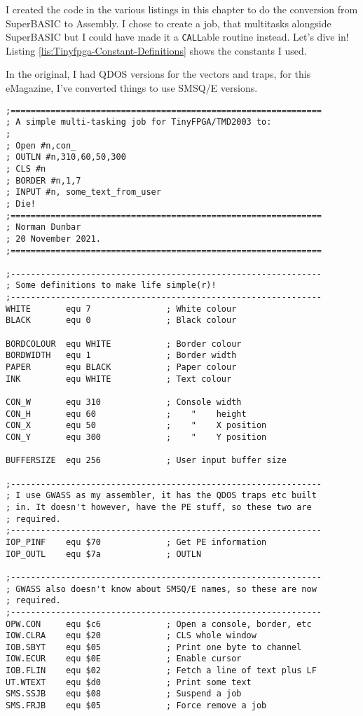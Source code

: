 I created the code in the various listings in this chapter to do the
conversion from SuperBASIC to Assembly. I chose to create a job, that
multitasks alongside SuperBASIC but I could have made it a \texttt{CALL}able
routine instead. Let's dive in! Listing \ref{lis:Tinyfpga-Constant-Definitions}
shows the constants I used.

In the original, I had QDOS versions for the vectors and traps, for
this eMagazine, I've converted things to use SMSQ/E versions.

\begin{lstlisting}[caption={Tinyfpga - Constant Definitions},label={lis:Tinyfpga-Constant-Definitions}]
;==============================================================
; A simple multi-tasking job for TinyFPGA/TMD2003 to:
;
; Open #n,con_
; OUTLN #n,310,60,50,300
; CLS #n
; BORDER #n,1,7
; INPUT #n, some_text_from_user
; Die!
;==============================================================
; Norman Dunbar
; 20 November 2021.
;==============================================================

;--------------------------------------------------------------
; Some definitions to make life simple(r)!
;--------------------------------------------------------------
WHITE       equ 7               ; White colour
BLACK       equ 0               ; Black colour

BORDCOLOUR  equ WHITE           ; Border colour
BORDWIDTH   equ 1               ; Border width
PAPER       equ BLACK           ; Paper colour
INK         equ WHITE           ; Text colour

CON_W       equ 310             ; Console width
CON_H       equ 60              ;    "    height
CON_X       equ 50              ;    "    X position
CON_Y       equ 300             ;    "    Y position

BUFFERSIZE  equ 256             ; User input buffer size

;--------------------------------------------------------------
; I use GWASS as my assembler, it has the QDOS traps etc built
; in. It doesn't however, have the PE stuff, so these two are
; required.
;--------------------------------------------------------------
IOP_PINF    equ $70             ; Get PE information
IOP_OUTL    equ $7a             ; OUTLN

;--------------------------------------------------------------
; GWASS also doesn't know about SMSQ/E names, so these are now
; required.
;--------------------------------------------------------------
OPW.CON     equ $c6             ; Open a console, border, etc
IOW.CLRA    equ $20             ; CLS whole window
IOB.SBYT    equ $05             ; Print one byte to channel
IOW.ECUR    equ $0E             ; Enable cursor
IOB.FLIN    equ $02             ; Fetch a line of text plus LF
UT.WTEXT    equ $d0             ; Print some text
SMS.SSJB    equ $08             ; Suspend a job
SMS.FRJB    equ $05             ; Force remove a job

\end{lstlisting}

